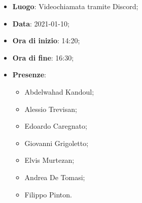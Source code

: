 \begin{itemize}
    \item \textbf{Luogo}: Videochiamata tramite Discord;
    \item \textbf{Data}: 2021-01-10;
    \item \textbf{Ora di inizio}: 14:20;
    \item \textbf{Ora di fine}: 16:30;
    \item \textbf{Presenze}:
          \begin{itemize}
            \item Abdelwahad Kandoul;
            \item Alessio Trevisan;
            \item Edoardo Caregnato;
            \item Giovanni Grigoletto;
            \item Elvis Murtezan;
            \item Andrea De Tomasi;
            \item Filippo Pinton.
          \end{itemize}
\end{itemize}